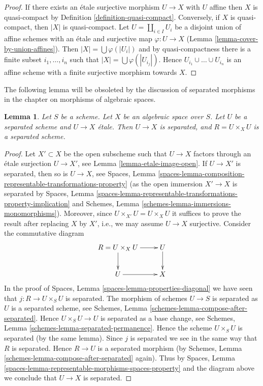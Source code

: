 \documentclass{stacks-project}
\theoremstyle{plain}
\newtheorem{lemma}[subsection]{Lemma}
\theoremstyle{definition}
\theoremstyle{remark}
\numberwithin{equation}{subsection}
\begin{document}
\begin{proof}
If there exists an \'etale surjective morphism $U \to X$ with $U$
affine then $X$ is quasi-compact by Definition \ref{definition-quasi-compact}.
Conversely, if $X$ is quasi-compact, then $|X|$ is quasi-compact.
Let $U = \coprod_{i \in I} U_i$ be a disjoint union of affine schemes
with an \'etale and surjective map $\varphi : U \to X$
(Lemma \ref{lemma-cover-by-union-affines}).
Then $|X| = \bigcup \varphi(|U_i|)$ and
by quasi-compactness there is a finite subset $i_1, \ldots, i_n$
such that $|X| = \bigcup \varphi(|U_{i_j}|)$. Hence
$U_{i_1} \cup \ldots \cup U_{i_n}$ is an affine scheme with a
finite surjective morphism towards $X$.
\end{proof}

\noindent
The following lemma will be obsoleted by the discussion of
separated morphisms in the chapter on morphisms of algebraic spaces.

\begin{lemma}
\label{lemma-separated-cover}
Let $S$ be a scheme.
Let $X$ be an algebraic space over $S$.
Let $U$ be a separated scheme and $U \to X$ \'etale.
Then $U \to X$ is separated, and $R = U \times_X U$ is a separated scheme.
\end{lemma}

\begin{proof}
Let $X' \subset X$ be the open subscheme such that $U \to X$ factors
through an \'etale surjection $U \to X'$, see
Lemma \ref{lemma-etale-image-open}.
If $U \to X'$ is separated, then so is $U \to X$, see
Spaces, Lemma
\ref{spaces-lemma-composition-representable-transformations-property}
(as the open immersion $X' \to X$ is separated by
Spaces, Lemma
\ref{spaces-lemma-representable-transformations-property-implication}
and
Schemes, Lemma \ref{schemes-lemma-immersions-monomorphisms}).
Moreover, since $U \times_{X'} U = U \times_X U$ it suffices
to prove the result after replacing $X$ by $X'$, i.e., we may
assume $U \to X$ surjective.
Consider the commutative diagram
$$
\xymatrix{
R = U \times_X U \ar[r] \ar[d] & U \ar[d] \\
U \ar[r] & X
}
$$
In the proof of
Spaces, Lemma \ref{spaces-lemma-properties-diagonal}
we have seen that $j : R \to U \times_S U$ is separated.
The morphism of schemes $U \to S$ is separated as $U$ is a separated
scheme, see
Schemes, Lemma \ref{schemes-lemma-compose-after-separated}.
Hence $U \times_S U \to U$ is separated as a base change, see
Schemes, Lemma \ref{schemes-lemma-separated-permanence}.
Hence the scheme $U \times_S U$ is separated (by the same lemma).
Since $j$ is separated we see in the same way that $R$ is separated.
Hence $R \to U$ is a separated morphism (by
Schemes, Lemma \ref{schemes-lemma-compose-after-separated}
again). Thus by
Spaces, Lemma \ref{spaces-lemma-representable-morphisms-spaces-property}
and the diagram above we conclude that $U \to X$ is separated.
\end{proof}
\end{document}
